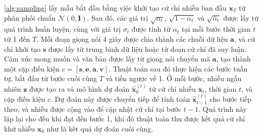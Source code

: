 \autoref{alg:sampling} lấy mẫu bắt đầu bằng việc khởi tạo cử chỉ nhiễu ban đầu $\mathbf{x}_T$ từ phân phối chuẩn $\mathcal{N}(0, \mathbf{I})$. Sau đó, các giá trị $\sqrt{\alpha_t}$, $\sqrt{1 - \alpha_t}$ và $\sqrt{\bar{\alpha}_t}$ được lấy từ quá trình huấn luyện, cùng với giá trị $\sigma_t$ được tính từ $\alpha_t$ tại mỗi bước thời gian $t$ từ 1 đến $T$. Mỗi đoạn giọng nói 4 giây được chia thành các chuỗi dữ liệu $\mathbf{a}$, và cử chỉ khởi tạo $\mathbf{s}$ được lấy từ trung bình dữ liệu hoặc từ đoạn cử chỉ đã suy luận. Cảm xúc mong muốn và văn bản được lấy từ giọng nói chuyển mã $\mathbf{a}$, tạo thành một cặp điều kiện $c = [\mathbf{s}, \mathbf{e}, \mathbf{a}, \mathbf{v}]$. Thuật toán sau đó thực hiện các bước tuần tự, bắt đầu từ bước cuối cùng $T$ và tiến ngược về 1. Ở mỗi bước, nhiễu ngẫu nhiên $\mathbf{z}$ được tạo ra và mô hình dự đoán $\hat{\mathbf{x}}_0^{(t)}$ từ cử chỉ nhiễu $\mathbf{x}_t$, thời gian $t$, và cặp điều kiện $c$. Dự đoán này được chuyển tiếp để tính toán $\hat{\mathbf{x}}_{t-1}^{(t)}$ cho bước tiếp theo, và nhiễu được cộng vào để cập nhật cử chỉ tại bước $t-1$. Quá trình này lặp lại cho đến khi đạt đến bước 1, khi đó thuật toán thu được kết quả cử chỉ khử nhiễu $\hat{\mathbf{x}}_0$ như là kết quả dự đoán cuối cùng.

